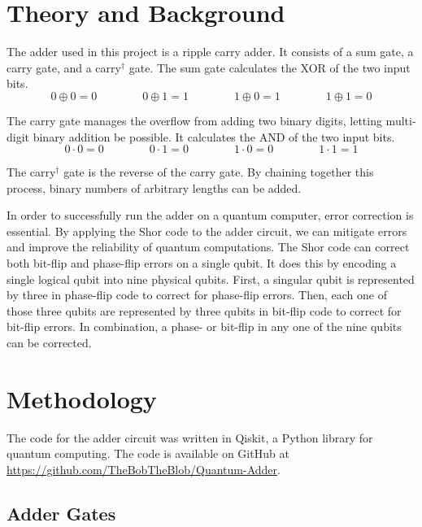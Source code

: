 \documentclass[letterpaper]{article}
\begin{document}
\section{Theory and Background}

The adder used in this project is a ripple carry adder. It consists of a sum gate, a carry gate, and a carry\(^{\dagger}\) gate. The sum gate calculates the XOR of the two input bits.
\begin{equation*}
    0 \oplus 0 = 0 \qquad\qquad 0 \oplus 1 = 1 \qquad\qquad 1 \oplus 0 = 1 \qquad\qquad 1 \oplus 1 = 0
\end{equation*}

The carry gate manages the overflow from adding two binary digits, letting multi-digit binary addition be possible. It calculates the AND of the two input bits.
\begin{equation*}
    0 \cdot 0 = 0 \qquad\qquad 0 \cdot 1 = 0 \qquad\qquad 1 \cdot 0 = 0 \qquad\qquad 1 \cdot 1 = 1
\end{equation*}

The carry\(^{\dagger}\) gate is the reverse of the carry gate. By chaining together this process, binary numbers of arbitrary lengths can be added.

In order to successfully run the adder on a quantum computer, error correction is essential. By applying the Shor code to the adder circuit, we can mitigate errors and improve the reliability of quantum computations. The Shor code can correct both bit-flip and phase-flip errors on a single qubit. It does this by encoding a single logical qubit into nine physical qubits. First, a singular qubit is represented by three in phase-flip code to correct for phase-flip errors. Then, each one of those three qubits are represented by three qubits in bit-flip code to correct for bit-flip errors. In combination, a phase- or bit-flip in any one of the nine qubits can be corrected.

\section{Methodology}

The code for the adder circuit was written in Qiskit, a Python library for quantum computing. The code is available on GitHub at \url{https://github.com/TheBobTheBlob/Quantum-Adder}.

\subsection{Adder Gates}
\end{document}
